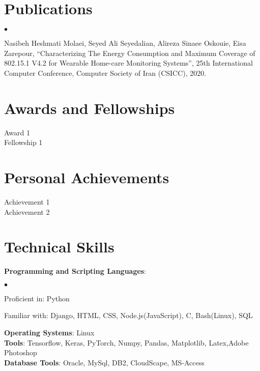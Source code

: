 \documentclass[margin,line]{res}
\newenvironment{list2}{
  \begin{list}{$\bullet$}{%
      \setlength{\itemsep}{0in}
      \setlength{\parsep}{0in} \setlength{\parskip}{0in}
      \setlength{\topsep}{0in} \setlength{\partopsep}{0in}
      \setlength{\leftmargin}{0.2in}}}{\end{list}}
\begin{document}
\begin{resume}
\section{\sc Publications}
\begin{list2}
	\item Nasibeh Heshmati Molaei, Seyed Ali Seyedalian, Alireza Sinaee Oskouie, Eisa Zarepour, “Characterizing
	The Energy Consumption and Maximum Coverage of 802.15.1 V4.2 for Wearable Home-care Monitoring
	Systems”, 25th International Computer Conference, Computer Society of Iran (CSICC), 2020.
\end{list2}

\section{\sc Awards and Fellowships}
Award 1\\
Fellowship 1\\
\section{\sc Personal Achievements}
Achievement 1\\
Achievement 2\\
\section{\sc Technical Skills}
{\bf Programming and Scripting Languages}:  
\begin{list2} %
	\item Proficient in: Python
	\item Familiar with: Django, HTML, CSS, Node.js(JavaScript), C, Bash(Linux), SQL\\
\end{list2}
{\bf Operating Systems}: Linux\\
{\bf Tools}: Tensorflow, Keras, PyTorch, Numpy, Pandas, Matplotlib, Latex,Adobe Photoshop \\
{\bf Database Tools}: Oracle, MySql, DB2, CloudScape, MS-Access 

\end{resume}
\end{document}
